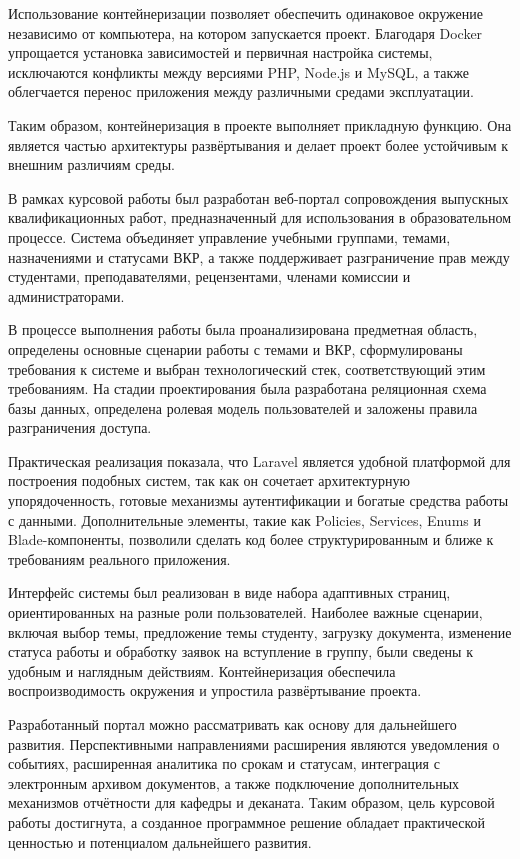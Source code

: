 \documentclass[14pt,a4paper]{extreport}
\begin{document}
Использование контейнеризации позволяет обеспечить одинаковое окружение
независимо от компьютера, на котором запускается проект. Благодаря Docker
упрощается установка зависимостей и первичная настройка системы, исключаются
конфликты между версиями PHP, Node.js и MySQL, а также облегчается перенос
приложения между различными средами эксплуатации.

Таким образом, контейнеризация в проекте выполняет прикладную функцию.
Она является частью архитектуры развёртывания и делает проект более устойчивым
к внешним различиям среды.

\newpage
\conclusion

В рамках курсовой работы был разработан веб-портал сопровождения выпускных
квалификационных работ, предназначенный для использования в образовательном
процессе.
Система объединяет управление учебными группами, темами, назначениями и
статусами ВКР, а также поддерживает разграничение прав между студентами,
преподавателями, рецензентами, членами комиссии и администраторами.

В процессе выполнения работы была проанализирована предметная область,
определены основные сценарии работы с темами и ВКР, сформулированы требования
к системе и выбран технологический стек, соответствующий этим требованиям.
На стадии проектирования была разработана реляционная схема базы данных,
определена ролевая модель пользователей и заложены правила разграничения
доступа.

Практическая реализация показала, что Laravel является удобной платформой
для построения подобных систем, так как он сочетает архитектурную
упорядоченность, готовые механизмы аутентификации и богатые средства работы
с данными.
Дополнительные элементы, такие как Policies, Services, Enums и
Blade-компоненты, позволили сделать код более структурированным и ближе к
требованиям реального приложения.

Интерфейс системы был реализован в виде набора адаптивных страниц,
ориентированных на разные роли пользователей.
Наиболее важные сценарии, включая выбор темы, предложение темы студенту,
загрузку документа, изменение статуса работы и обработку заявок на вступление
в группу, были сведены к удобным и наглядным действиям.
Контейнеризация обеспечила воспроизводимость окружения и упростила
развёртывание проекта.

Разработанный портал можно рассматривать как основу для дальнейшего развития.
Перспективными направлениями расширения являются уведомления о событиях,
расширенная аналитика по срокам и статусам, интеграция с электронным архивом
документов, а также подключение дополнительных механизмов отчётности для
кафедры и деканата.
Таким образом, цель курсовой работы достигнута, а созданное программное
решение обладает практической ценностью и потенциалом дальнейшего развития.
\end{document}

